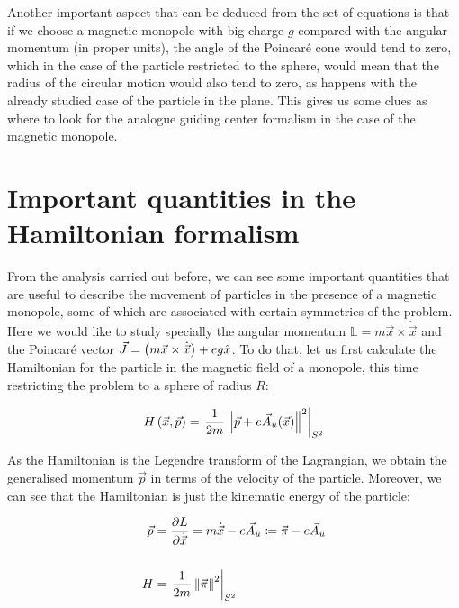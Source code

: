 Another important aspect that can be deduced from the set of equations  is that if we choose a magnetic monopole with big charge $g$ compared with the angular momentum (in proper units), the angle of the Poincar\'e cone would tend to zero, which in the case of the particle restricted to the sphere, would mean that the radius of the circular motion would also tend to zero, as happens with the already studied case of the particle in the plane. This gives us some clues as where to look for the analogue guiding center formalism in the case of the magnetic monopole.\\

\section{Important quantities in the Hamiltonian formalism}
From the analysis carried out before, we can see some important quantities that are useful to describe the movement of particles in the presence of a magnetic monopole, some of which are associated with certain symmetries of the problem. Here we would like to study specially the angular momentum $\mathbb{L}= m\vec{x}\times\dot{\vec{x}}$ and the Poincar\'e vector $\vec{J} = \left( m\vec{x}\times\dot{\vec{x}} \right)+ eg\hat{x}$. To do that, let us first calculate the Hamiltonian for the particle in the magnetic field of a monopole, this time restricting the problem to a sphere of radius $R$:

\begin{equation}
H\left( \vec{x},\vec{p} \right) = \left.\frac{1}{2m}\left\lVert \vec{p}+e\vec{A}_{\hat{u}}(\vec{x}) \right\rVert^2\right|_{S^2}
\label{hamiltonian}
\end{equation}

As the Hamiltonian is the Legendre transform of the Lagrangian, we obtain the generalised momentum $\vec{p}$  in terms of the velocity of the particle. Moreover, we can see that the Hamiltonian is just the kinematic energy of the particle:

\begin{equation*}
\begin{aligned}
\vec{p} &= \frac{\partial L}{\partial \dot{\vec{x}}} = m\dot{\vec{x}}-e\vec{A}_{\hat{u}} \coloneqq \vec{\pi}-e\vec{A}_{\hat{u}} \\
\\
H &= \left.\frac{1}{2m}\left\lVert \vec{\pi} \right\rVert^2\right|_{S^2}
\end{aligned}
\end{equation*}

